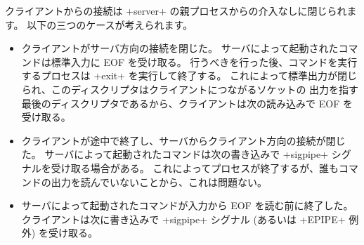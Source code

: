 クライアントからの接続は \ml+server+ の親プロセスからの介入なしに閉じられます。
以下の三つのケースが考えられます。

\begin{itemize}
\item クライアントがサーバ方向の接続を閉じた。
  サーバによって起動されたコマンドは標準入力に EOF を受け取る。
  行うべきを行った後、コマンドを実行するプロセスは \ml+exit+ を実行して終了する。
  これによって標準出力が閉じられ、このディスクリプタはクライアントにつながるソケットの
  出力を指す最後のディスクリプタであるから、クライアントは次の読み込みで EOF を受け取る。

\item クライアントが途中で終了し、サーバからクライアント方向の接続が閉じた。
  サーバによって起動されたコマンドは次の書き込みで \ml+sigpipe+ シグナルを受け取る場合がある。
  これによってプロセスが終了するが、誰もコマンドの出力を読んでいないことから、これは問題ない。

\item サーバによって起動されたコマンドが入力から EOF を読む前に終了した。
  クライアントは次に書き込みで \ml+sigpipe+ シグナル (あるいは \ml+EPIPE+ 例外) を受け取る。
\end{itemize}

